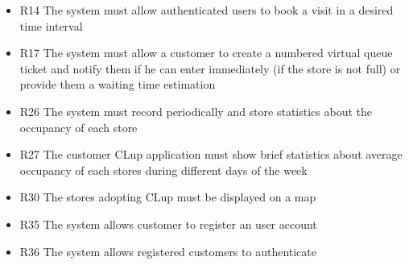 \begin{itemize}
\begin{itemize}
        \item R14 The system must allow authenticated users to book a visit in a desired time interval
        \item R17 The system must allow a customer to create a numbered virtual queue ticket and notify them if he can enter immediately (if the store is not full) or provide them a waiting time estimation
        \item R26 The system must record periodically and store statistics about the occupancy of each store
        \item R27 The customer CLup application must show brief statistics about average occupancy of each stores during different days of the week
        \item R30 The stores adopting CLup must be displayed on a map        
        \item R35 The system allows customer to register an user account
        \item R36 The system allows registered customers to authenticate
    \end{itemize}
\end{itemize}

\clearpage
